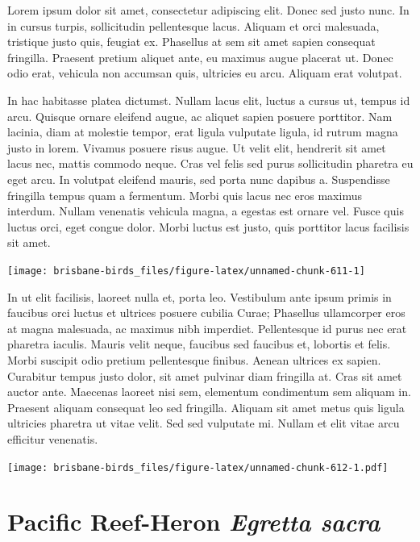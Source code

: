 \documentclass[]{book}
\let\origfigure\figure
\let\endorigfigure\endfigure
\renewenvironment{figure}[1][2] {
  \expandafter\origfigure\expandafter[H]
} {
  \endorigfigure
}
\begin{document}
Lorem ipsum dolor sit amet, consectetur adipiscing elit. Donec sed justo
nunc. In in cursus turpis, sollicitudin pellentesque lacus. Aliquam et
orci malesuada, tristique justo quis, feugiat ex. Phasellus at sem sit
amet sapien consequat fringilla. Praesent pretium aliquet ante, eu
maximus augue placerat ut. Donec odio erat, vehicula non accumsan quis,
ultricies eu arcu. Aliquam erat volutpat.

In hac habitasse platea dictumst. Nullam lacus elit, luctus a cursus ut,
tempus id arcu. Quisque ornare eleifend augue, ac aliquet sapien posuere
porttitor. Nam lacinia, diam at molestie tempor, erat ligula vulputate
ligula, id rutrum magna justo in lorem. Vivamus posuere risus augue. Ut
velit elit, hendrerit sit amet lacus nec, mattis commodo neque. Cras vel
felis sed purus sollicitudin pharetra eu eget arcu. In volutpat eleifend
mauris, sed porta nunc dapibus a. Suspendisse fringilla tempus quam a
fermentum. Morbi quis lacus nec eros maximus interdum. Nullam venenatis
vehicula magna, a egestas est ornare vel. Fusce quis luctus orci, eget
congue dolor. Morbi luctus est justo, quis porttitor lacus facilisis sit
amet.

\begin{figure}
\texttt{[image: brisbane-birds\_files/figure-latex/unnamed-chunk-611-1]} \caption{insert figure caption}\label{fig:unnamed-chunk-611}
\end{figure}

In ut elit facilisis, laoreet nulla et, porta leo. Vestibulum ante ipsum
primis in faucibus orci luctus et ultrices posuere cubilia Curae;
Phasellus ullamcorper eros at magna malesuada, ac maximus nibh
imperdiet. Pellentesque id purus nec erat pharetra iaculis. Mauris velit
neque, faucibus sed faucibus et, lobortis et felis. Morbi suscipit odio
pretium pellentesque finibus. Aenean ultrices ex sapien. Curabitur
tempus justo dolor, sit amet pulvinar diam fringilla at. Cras sit amet
auctor ante. Maecenas laoreet nisi sem, elementum condimentum sem
aliquam in. Praesent aliquam consequat leo sed fringilla. Aliquam sit
amet metus quis ligula ultricies pharetra ut vitae velit. Sed sed
vulputate mi. Nullam et elit vitae arcu efficitur venenatis.

\begin{figure}
\centering
\texttt{[image: brisbane-birds\_files/figure-latex/unnamed-chunk-612-1.pdf]}
\caption{\label{fig:unnamed-chunk-612}insert figure caption}
\end{figure}

\section{\texorpdfstring{Pacific Reef-Heron \emph{Egretta
sacra}}{Pacific Reef-Heron Egretta sacra}}\label{pacific-reef-heron-egretta-sacra}
\end{document}
